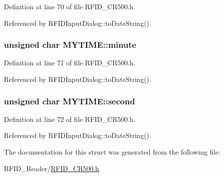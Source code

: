 Definition at line 70 of file RFID\_\-CR500.h.

Referenced by RFIDInputDialog::toDateString().\hypertarget{struct_m_y_t_i_m_e_8033dc39f4e81961d8b11ce373dbbd56}{
\subsubsection[minute]{\setlength{\rightskip}{0pt plus 5cm}unsigned char {\bf MYTIME::minute}}}
\label{struct_m_y_t_i_m_e_8033dc39f4e81961d8b11ce373dbbd56}




Definition at line 71 of file RFID\_\-CR500.h.

Referenced by RFIDInputDialog::toDateString().\hypertarget{struct_m_y_t_i_m_e_41ed7eedee0633eb8cd09672665c9c0c}{
\subsubsection[second]{\setlength{\rightskip}{0pt plus 5cm}unsigned char {\bf MYTIME::second}}}
\label{struct_m_y_t_i_m_e_41ed7eedee0633eb8cd09672665c9c0c}




Definition at line 72 of file RFID\_\-CR500.h.

Referenced by RFIDInputDialog::toDateString().

The documentation for this struct was generated from the following file:\begin{CompactItemize}
\item 
RFID\_\-Reader/\hyperlink{_r_f_i_d___c_r500_8h}{RFID\_\-CR500.h}\end{CompactItemize}
